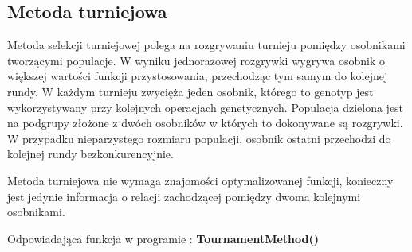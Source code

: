 
\subsection{Metoda turniejowa}\label{sec:narzedzia}


Metoda selekcji turniejowej polega na rozgrywaniu turnieju pomiędzy osobnikami tworzącymi populacje. W wyniku jednorazowej rozgrywki wygrywa osobnik o większej wartości funkcji przystosowania, przechodząc tym samym do kolejnej rundy. W każdym turnieju zwycięża jeden osobnik, którego to genotyp jest wykorzystywany przy kolejnych operacjach genetycznych. Populacja dzielona jest na podgrupy złożone z dwóch osobników w których to dokonywane są rozgrywki. W przypadku nieparzystego rozmiaru populacji, osobnik ostatni przechodzi do kolejnej rundy bezkonkurencyjnie. \\
\par
Metoda turniejowa nie wymaga znajomości optymalizowanej funkcji, konieczny jest jedynie informacja o relacji zachodzącej pomiędzy dwoma kolejnymi osobnikami. 
\par
Odpowiadająca funkcja w programie : \textbf{TournamentMethod()}


